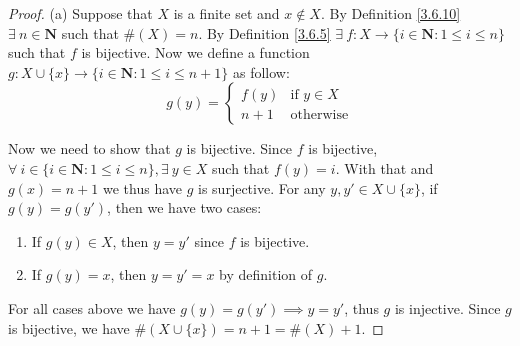 \begin{proof}{(a)}
    Suppose that \(X\) is a finite set and \(x \notin X\).
    By Definition \ref{3.6.10} \(\exists\ n \in \mathbf{N}\) such that \(\#(X) = n\).
    By Definition \ref{3.6.5} \(\exists\ f : X \to \{i \in \mathbf{N} : 1 \leq i \leq n\}\) such that \(f\) is bijective.
    Now we define a function \(g : X \cup \{x\} \to \{i \in \mathbf{N} : 1 \leq i \leq n + 1\}\) as follow:
    \[
        g(y) = \begin{cases}
            f(y)  & \text{if } y \in X \\
            n + 1 & \text{otherwise}
        \end{cases}
    \]

    Now we need to show that \(g\) is bijective.
    Since \(f\) is bijective, \(\forall\ i \in \{i \in \mathbf{N} : 1 \leq i \leq n\}, \exists\ y \in X\) such that \(f(y) = i\).
    With that and \(g(x) = n + 1\) we thus have \(g\) is surjective.
    For any \(y, y' \in X \cup \{x\}\), if \(g(y) = g(y')\), then we have two cases:
    \begin{enumerate}[label=(\roman*)]
        \item If \(g(y) \in X\), then \(y = y'\) since \(f\) is bijective.
        \item If \(g(y) = x\), then \(y = y' = x\) by definition of \(g\).
    \end{enumerate}
    For all cases above we have \(g(y) = g(y') \implies y = y'\), thus \(g\) is injective.
    Since \(g\) is bijective, we have \(\#(X \cup \{x\}) = n + 1 = \#(X) + 1\).
\end{proof}

